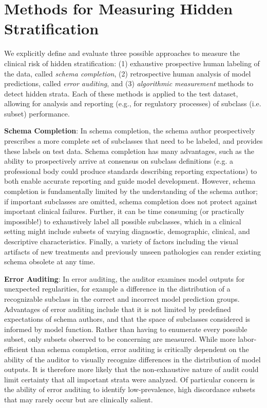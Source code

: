\documentclass[sigconf]{acmart}
\begin{document}
\section{Methods for Measuring Hidden Stratification}
\label{sec:methods}
We explicitly define and evaluate three possible approaches to measure the clinical risk of hidden stratification: (1) exhaustive prospective human labeling of the data, called \textit{schema completion}, (2) retrospective human analysis of model predictions, called \textit{error auditing}, and (3) \textit{algorithmic measurement} methods to detect hidden strata.  
Each of these methods is applied to the test dataset, allowing for analysis and reporting (e.g., for regulatory processes) of subclass (i.e. subset) performance.

\textbf{Schema Completion}: In schema completion, the schema author prospectively prescribes a more complete set of subclasses that need to be labeled, and provides these labels on test data. 
Schema completion has many advantages, such as the ability to prospectively arrive at consensus on subclass definitions (e.g. a professional body could produce standards describing reporting expectations) to both enable accurate reporting and guide model development.
However, schema completion is fundamentally limited by the understanding of the schema author; if important subclasses are omitted, schema completion does not protect against important clinical failures.
Further, it can be time consuming (or practically impossible!) to exhaustively label all possible subclasses, which in a clinical setting might include subsets of varying diagnostic, demographic, clinical, and descriptive characteristics.
Finally, a variety of factors including the visual artifacts of new treatments and previously unseen pathologies can render existing schema obsolete at any time.

\textbf{Error Auditing}: In error auditing, the auditor examines model outputs for unexpected regularities, for example a difference in the distribution of a recognizable subclass in the correct and incorrect model prediction groups. 
Advantages of error auditing include that it is not limited by predefined expectations of schema authors, and that the space of subclasses considered is informed by model function.
Rather than having to enumerate every possible subset, only subsets observed to be concerning are measured.
While more labor-efficient than schema completion, error auditing is critically dependent on the ability of the auditor to visually recognize differences in the distribution of model outputs.
It is therefore more likely that the non-exhaustive nature of audit could limit certainty that all important strata were analyzed.
Of particular concern is the ability of error auditing to identify low-prevalence, high discordance subsets that may rarely occur but are clinically salient.
\end{document}
